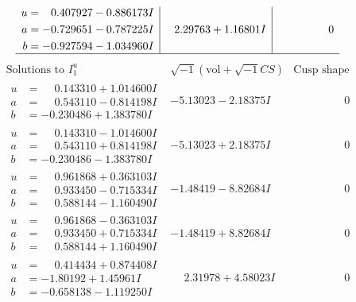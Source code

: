 \documentclass[1p]{elsarticle_modified}
\theoremstyle{definition}
\newcommand{\I}{\sqrt{-1}}
\begin{document}
$$\begin{array}{c|c|c}
\begin{aligned}
u &= \phantom{-}0.407927 - 0.886173 I \\
a &= -0.729651 - 0.787225 I \\
b &= -0.927594 - 1.034960 I\end{aligned}
 & \phantom{-}2.29763 + 1.16801 I & \phantom{-0.000000 } 0\\
 \hline 
 \end{array}$$\newpage$$\begin{array}{c|c|c}  
\text{Solutions to }I^u_{1}& \I (\text{vol} + \sqrt{-1}CS) & \text{Cusp shape}\\
 \hline 
\begin{aligned}
u &= \phantom{-}0.143310 + 1.014600 I \\
a &= \phantom{-}0.543110 - 0.814198 I \\
b &= -0.230486 + 1.383780 I\end{aligned}
 & -5.13023 - 2.18375 I & \phantom{-0.000000 } 0 \\ \hline\begin{aligned}
u &= \phantom{-}0.143310 - 1.014600 I \\
a &= \phantom{-}0.543110 + 0.814198 I \\
b &= -0.230486 - 1.383780 I\end{aligned}
 & -5.13023 + 2.18375 I & \phantom{-0.000000 } 0 \\ \hline\begin{aligned}
u &= \phantom{-}0.961868 + 0.363103 I \\
a &= \phantom{-}0.933450 - 0.715334 I \\
b &= \phantom{-}0.588144 - 1.160490 I\end{aligned}
 & -1.48419 - 8.82684 I & \phantom{-0.000000 } 0 \\ \hline\begin{aligned}
u &= \phantom{-}0.961868 - 0.363103 I \\
a &= \phantom{-}0.933450 + 0.715334 I \\
b &= \phantom{-}0.588144 + 1.160490 I\end{aligned}
 & -1.48419 + 8.82684 I & \phantom{-0.000000 } 0 \\ \hline\begin{aligned}
u &= \phantom{-}0.414434 + 0.874408 I \\
a &= -1.80192 + 1.45961 I \\
b &= -0.658138 - 1.119250 I\end{aligned}
 & \phantom{-}2.31978 + 4.58023 I & \phantom{-0.000000 } 0 \\ \hline\begin{aligned}

\end{aligned}
\end{array}$$
\end{document}
